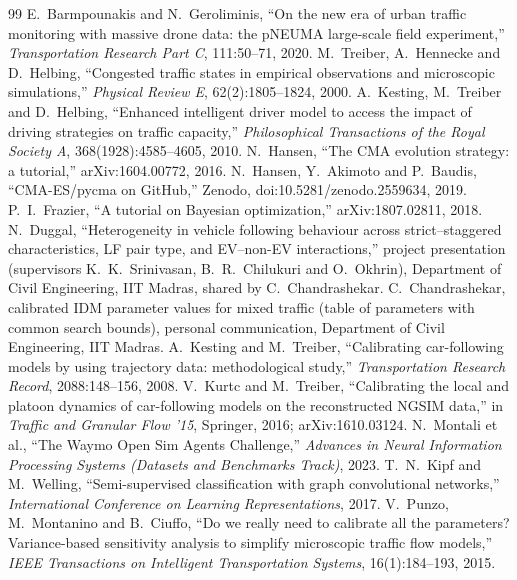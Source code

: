 \documentclass[11pt]{article}
\begin{document}
\begin{thebibliography}{99}
 E.~Barmpounakis and N.~Geroliminis, ``On the new era of urban
traffic monitoring with massive drone data: the pNEUMA large-scale field
experiment,'' \emph{Transportation Research Part C}, 111:50--71, 2020.
 M.~Treiber, A.~Hennecke and D.~Helbing, ``Congested traffic states
in empirical observations and microscopic simulations,'' \emph{Physical Review
E}, 62(2):1805--1824, 2000.
 A.~Kesting, M.~Treiber and D.~Helbing, ``Enhanced intelligent
driver model to access the impact of driving strategies on traffic capacity,''
\emph{Philosophical Transactions of the Royal Society A}, 368(1928):4585--4605,
2010.
 N.~Hansen, ``The CMA evolution strategy: a tutorial,''
arXiv:1604.00772, 2016.
 N.~Hansen, Y.~Akimoto and P.~Baudis, ``CMA-ES/pycma on GitHub,''
Zenodo, doi:10.5281/zenodo.2559634, 2019.
 P.~I.~Frazier, ``A tutorial on Bayesian optimization,''
arXiv:1807.02811, 2018.
 N.~Duggal, ``Heterogeneity in vehicle following behaviour across
strict--staggered characteristics, LF pair type, and EV--non-EV interactions,''
project presentation (supervisors K.~K.~Srinivasan, B.~R.~Chilukuri and
O.~Okhrin), Department of Civil Engineering, IIT Madras, shared by
C.~Chandrashekar.
 C.~Chandrashekar, calibrated IDM parameter values for mixed
traffic (table of parameters with common search bounds), personal communication,
Department of Civil Engineering, IIT Madras.
 A.~Kesting and M.~Treiber, ``Calibrating car-following models by
using trajectory data: methodological study,'' \emph{Transportation Research
Record}, 2088:148--156, 2008.
 V.~Kurtc and M.~Treiber, ``Calibrating the local and platoon
dynamics of car-following models on the reconstructed NGSIM data,'' in
\emph{Traffic and Granular Flow '15}, Springer, 2016; arXiv:1610.03124.
 N.~Montali et al., ``The Waymo Open Sim Agents Challenge,''
\emph{Advances in Neural Information Processing Systems (Datasets and
Benchmarks Track)}, 2023.
 T.~N.~Kipf and M.~Welling, ``Semi-supervised classification
with graph convolutional networks,'' \emph{International Conference on Learning
Representations}, 2017.
 V.~Punzo, M.~Montanino and B.~Ciuffo, ``Do we really need to
calibrate all the parameters? Variance-based sensitivity analysis to simplify
microscopic traffic flow models,'' \emph{IEEE Transactions on Intelligent
Transportation Systems}, 16(1):184--193, 2015.
\end{thebibliography}
\end{document}
